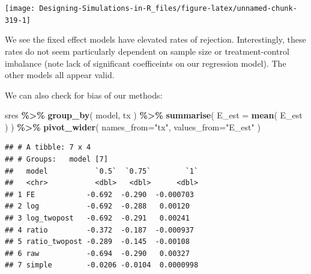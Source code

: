 \documentclass[
]{book}
\newenvironment{Shaded}{\begin{snugshade}}{\end{snugshade}}
\newcommand{\AttributeTok}[1]{\textcolor[rgb]{0.13,0.29,0.53}{#1}}
\newcommand{\DecValTok}[1]{\textcolor[rgb]{0.00,0.00,0.81}{#1}}
\newcommand{\FloatTok}[1]{\textcolor[rgb]{0.00,0.00,0.81}{#1}}
\newcommand{\FunctionTok}[1]{\textcolor[rgb]{0.13,0.29,0.53}{\textbf{#1}}}
\newcommand{\NormalTok}[1]{#1}
\newcommand{\SpecialCharTok}[1]{\textcolor[rgb]{0.81,0.36,0.00}{\textbf{#1}}}
\newcommand{\StringTok}[1]{\textcolor[rgb]{0.31,0.60,0.02}{#1}}
\begin{document}
\begin{Shaded}
\end{Shaded}

\begin{center}\texttt{[image: Designing-Simulations-in-R\_files/figure-latex/unnamed-chunk-319-1]} \end{center}

We see the fixed effect models have elevated rates of rejection.
Interestingly, these rates do not seem particularly dependent on sample size or treatment-control imbalance (note lack of significant coefficeints on our regression model).
The other models all appear valid.

We can also check for bias of our methods:

\begin{Shaded}
\begin{Highlighting}[]
\NormalTok{sres }\SpecialCharTok{\%\textgreater{}\%} \FunctionTok{group\_by}\NormalTok{( model, tx ) }\SpecialCharTok{\%\textgreater{}\%}
  \FunctionTok{summarise}\NormalTok{( }\AttributeTok{E\_est =} \FunctionTok{mean}\NormalTok{( E\_est ) ) }\SpecialCharTok{\%\textgreater{}\%}
  \FunctionTok{pivot\_wider}\NormalTok{( }\AttributeTok{names\_from=}\StringTok{"tx"}\NormalTok{, }\AttributeTok{values\_from=}\StringTok{"E\_est"}\NormalTok{ )}
\end{Highlighting}
\end{Shaded}

\begin{verbatim}
## # A tibble: 7 x 4
## # Groups:   model [7]
##   model           `0.5`  `0.75`        `1`
##   <chr>           <dbl>   <dbl>      <dbl>
## 1 FE            -0.692  -0.290  -0.000703 
## 2 log           -0.692  -0.288   0.00120  
## 3 log_twopost   -0.692  -0.291   0.00241  
## 4 ratio         -0.372  -0.187  -0.000937 
## 5 ratio_twopost -0.289  -0.145  -0.00108  
## 6 raw           -0.694  -0.290   0.00327  
## 7 simple        -0.0206 -0.0104  0.0000998
\end{verbatim}
\end{document}
